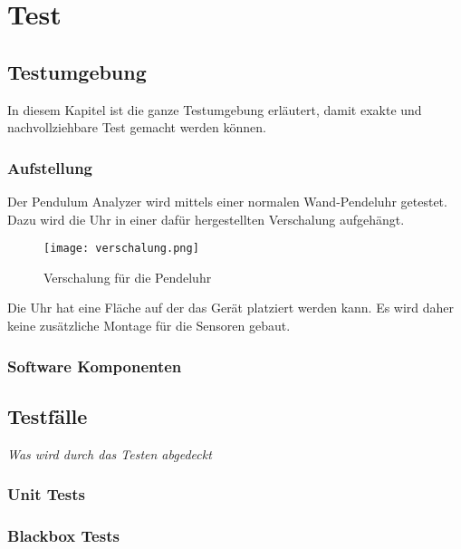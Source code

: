 \section{Test}
		\subsection{Testumgebung}
        In diesem Kapitel ist die ganze Testumgebung erläutert, damit exakte und nachvollziehbare Test gemacht werden können.
        \subsubsection{Aufstellung}
        Der Pendulum Analyzer wird mittels einer normalen Wand-Pendeluhr getestet. Dazu wird die Uhr in einer dafür hergestellten Verschalung aufgehängt.
        \begin{figure}[H]
            \centering
            \texttt{[image: verschalung.png]}
            \caption{Verschalung für die Pendeluhr}
        \end{figure}

        \noindent Die Uhr hat eine Fläche auf der das Gerät platziert werden kann. Es wird daher keine zusätzliche Montage für die Sensoren gebaut.
        
        \subsubsection{Software Komponenten}

		\subsection{Testfälle}
			\textit{Was wird durch das Testen abgedeckt}
			\subsubsection{Unit Tests}
			\subsubsection{Blackbox Tests}